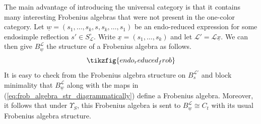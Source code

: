 \documentclass{amsart}
\newcommand{\scrL}{\mathcal{L}}
\newcommand{\uw}{\underline{w}}
\newcommand{\ux}{\underline{x}}
\theoremstyle{definition}
\numberwithin{equation}{subsection}
\begin{document}
The main advantage of introducing the universal category is that it contains many interesting Frobenius algebras that were not present in the one-color category.
Let $\uw = (s_1, \ldots, s_k, s, s_k, \ldots, s_1)$ be an endo-reduced expression for some endosimple reflection $s' \in S_{\scrL}^{\circ}$.
Write $\ux = (s_1, \ldots, s_k)$ and let $\scrL' = \scrL \ux$.
We can then give $B_{\uw}^{\scrL}$ the structure of a Frobenius algebra as follows.
\begin{equation}\label{eq:frob_algebra_str_diagrammatically}
    \tikzfig{endo_reduced_frob}
\end{equation}
It is easy to check from the Frobenius algebra structure on $B_{s}^{\scrL'}$ and block minimality that $B_{\uw}^{\scrL}$ along with the maps in (\ref{eq:frob_algebra_str_diagrammatically}) define a Frobenius algebra.
Moreover, it follows that under $\Upsilon_S$, this Frobenius algebra is sent to $B_{\uw}^{\scrL} \cong C_{t}$ with its usual Frobenius algebra structure.
\end{document}
